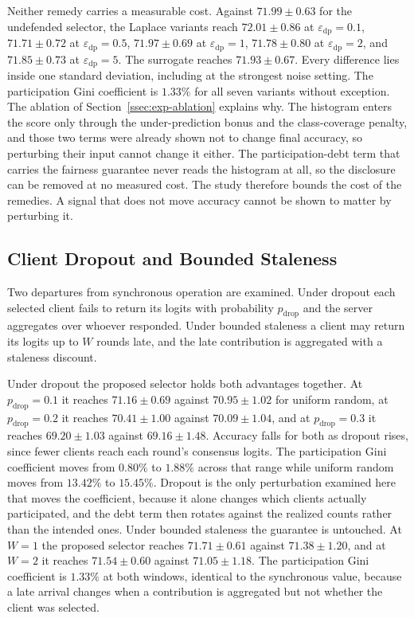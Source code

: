\documentclass[journal]{IEEEtran}
\newcommand{\rev}[1]{{\color{blue}#1}}
\begin{document}
\rev{Neither remedy carries a measurable cost. Against $71.99 \pm 0.63$ for the undefended selector, the Laplace variants reach $72.01 \pm 0.86$ at $\varepsilon_{\mathrm{dp}} = 0.1$, $71.71 \pm 0.72$ at $\varepsilon_{\mathrm{dp}} = 0.5$, $71.97 \pm 0.69$ at $\varepsilon_{\mathrm{dp}} = 1$, $71.78 \pm 0.80$ at $\varepsilon_{\mathrm{dp}} = 2$, and $71.85 \pm 0.73$ at $\varepsilon_{\mathrm{dp}} = 5$. The surrogate reaches $71.93 \pm 0.67$. Every difference lies inside one standard deviation, including at the strongest noise setting. The participation Gini coefficient is $1.33\%$ for all seven variants without exception. The ablation of Section~\ref{ssec:exp-ablation} explains why. The histogram enters the score only through the under-prediction bonus and the class-coverage penalty, and those two terms were already shown not to change final accuracy, so perturbing their input cannot change it either. The participation-debt term that carries the fairness guarantee never reads the histogram at all, so the disclosure can be removed at no measured cost. The study therefore bounds the cost of the remedies. A signal that does not move accuracy cannot be shown to matter by perturbing it.}

\subsection{Client Dropout and Bounded Staleness}
\label{ssec:exp-dropout}

\rev{Two departures from synchronous operation are examined. Under dropout each selected client fails to return its logits with probability $p_{\text{drop}}$ and the server aggregates over whoever responded. Under bounded staleness a client may return its logits up to $W$ rounds late, and the late contribution is aggregated with a staleness discount.}

\rev{Under dropout the proposed selector holds both advantages together. At $p_{\text{drop}} = 0.1$ it reaches $71.16 \pm 0.69$ against $70.95 \pm 1.02$ for uniform random, at $p_{\text{drop}} = 0.2$ it reaches $70.41 \pm 1.00$ against $70.09 \pm 1.04$, and at $p_{\text{drop}} = 0.3$ it reaches $69.20 \pm 1.03$ against $69.16 \pm 1.48$. Accuracy falls for both as dropout rises, since fewer clients reach each round's consensus logits. The participation Gini coefficient moves from $0.80\%$ to $1.88\%$ across that range while uniform random moves from $13.42\%$ to $15.45\%$. Dropout is the only perturbation examined here that moves the coefficient, because it alone changes which clients actually participated, and the debt term then rotates against the realized counts rather than the intended ones. Under bounded staleness the guarantee is untouched. At $W = 1$ the proposed selector reaches $71.71 \pm 0.61$ against $71.38 \pm 1.20$, and at $W = 2$ it reaches $71.54 \pm 0.60$ against $71.05 \pm 1.18$. The participation Gini coefficient is $1.33\%$ at both windows, identical to the synchronous value, because a late arrival changes when a contribution is aggregated but not whether the client was selected.}
\end{document}
